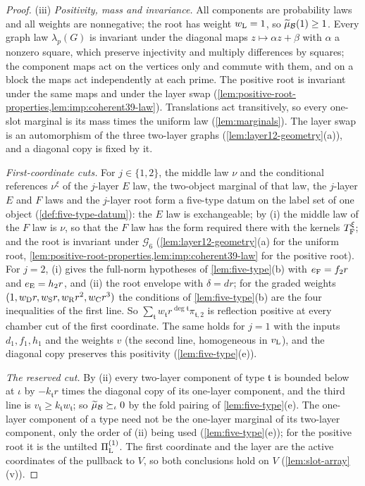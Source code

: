 \begin{proof}
(iii) \emph{Positivity, mass and invariance.} All components are probability
laws and all weights are nonnegative; the root has weight $w_{\rm L}=1$, so
$\widetilde\mu_{\mathcal B}(1)\ge1$. Every graph law $\lambda_p(G)$ is invariant under
the diagonal maps $z\mapsto\alpha z+\beta$ with $\alpha$ a nonzero square,
which preserve injectivity and multiply differences by squares; the
component maps act on the vertices only and commute with them, and on a
block the maps act independently at each prime. The positive root is
invariant under the same maps and under the layer swap
(\cref{lem:positive-root-properties,lem:imp:coherent39-law}). Translations act transitively, so every
one-slot marginal is its mass times the uniform law (\cref{lem:marginals}). The layer swap is an
automorphism of the three two-layer graphs (\cref{lem:layer12-geometry}(a)),
and a diagonal copy is fixed by it.

\emph{First-coordinate cuts.} For $j\in\{1,2\}$, the middle law $\nu$ and the
conditional references $\nu^\xi$ of the $j$-layer $E$ law, the two-object marginal of that law, the $j$-layer $E$ and $F$ laws and the $j$-layer root form a
five-type datum on the label set of one object (\cref{def:five-type-datum}):
the $E$ law is exchangeable; by (i) the middle law of the $F$ law is $\nu$, so
that the $F$ law has the form required there with the kernels $T^\xi_{\rm F}$;
and the root is invariant under $\mathcal G_6$ (\cref{lem:layer12-geometry}(a)
for the uniform root, \cref{lem:positive-root-properties,lem:imp:coherent39-law}
for the positive root). For $j=2$, (i) gives the full-norm hypotheses
of \cref{lem:five-type}(b) with $e_{\rm F}=f_2r$ and $e_{\rm E}=h_2r$, and (ii)
the root envelope with $\delta=dr$; for the graded weights
$(1,w_{\rm D}r,w_{\rm S}r,w_{\rm R}r^2,w_{\rm C}r^3)$ the conditions of
\cref{lem:five-type}(b) are the four inequalities of the first line. So
$\sum_{\mathfrak t}w_{\mathfrak t}r^{\deg\mathfrak t}\pi_{\mathfrak t,2}$ is
reflection positive at every chamber cut of the first coordinate. The same
holds for $j=1$ with the inputs $d_1,f_1,h_1$ and the weights $v$ (the second
line, homogeneous in $v_{\rm L}$), and the diagonal copy preserves this
positivity (\cref{lem:five-type}(e)).

\emph{The reserved cut.} By (ii) every two-layer component of type $\mathfrak t$
is bounded below at $\iota$ by $-k_{\mathfrak t}r$ times the diagonal copy of its
one-layer component, and the third line is
$v_{\mathfrak t}\ge k_{\mathfrak t}w_{\mathfrak t}$; so
$\widetilde\mu_{\mathcal B}\succeq_\iota0$ by the fold pairing of
\cref{lem:five-type}(e). The one-layer component of a type need not be the
one-layer marginal of its two-layer component, only the order of (ii) being
used (\cref{lem:five-type}(e)); for the positive root it is the untilted
$\Pi^{(1)}_{\rm L}$. The first coordinate and
the layer are the active coordinates of the pullback to $V$, so both
conclusions hold on $V$ (\cref{lem:slot-array}(v)).


\end{proof}
